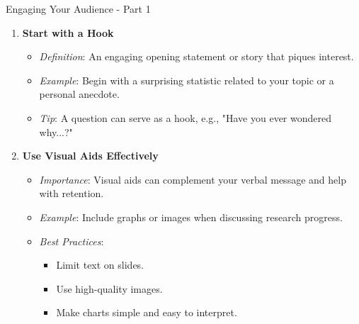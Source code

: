 \documentclass[aspectratio=169]{beamer}
\begin{document}
\begin{frame}[fragile]{Engaging Your Audience - Part 1}
    \begin{enumerate}
        \item \textbf{Start with a Hook}
        \begin{itemize}
            \item \textit{Definition}: An engaging opening statement or story that piques interest.
            \item \textit{Example}: Begin with a surprising statistic related to your topic or a personal anecdote.
            \item \textit{Tip}: A question can serve as a hook, e.g., "Have you ever wondered why...?"
        \end{itemize}
        
        \item \textbf{Use Visual Aids Effectively}
        \begin{itemize}
            \item \textit{Importance}: Visual aids can complement your verbal message and help with retention.
            \item \textit{Example}: Include graphs or images when discussing research progress.
            \item \textit{Best Practices}:
            \begin{itemize}
                \item Limit text on slides.
                \item Use high-quality images.
                \item Make charts simple and easy to interpret.
            \end{itemize}
        \end{itemize}
    \end{enumerate}
\end{frame}
\end{document}
